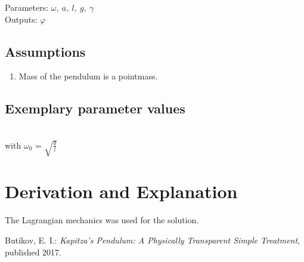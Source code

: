 \documentclass[10pt,a4paper]{article}
\begin{document}
	\noindent
	Parameters: $\omega, ~a, ~l, ~g, ~\gamma$ %
	\\
	Outputs: $\varphi$ %
	
	
	\subsection{Assumptions} %
		\begin{enumerate} %
			\item Mass of the pendulum is a pointmass. 
		\end{enumerate}
	
	
	\subsection{Exemplary parameter values}
	
	\\
	with $\omega_0$ = $\sqrt{\frac{g}{l}}$

	
	\section{Derivation and Explanation} %
	The Lagrangian mechanics was used for the solution.
	
	
	\begin{thebibliography}{10}		
		Butikov, E. I.: 
		\textit{Kapitza’s Pendulum: A Physically Transparent Simple Treatment}, published 2017.
	\end{thebibliography}
\end{document}
